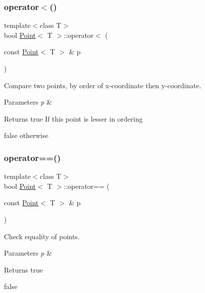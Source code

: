 \subsubsection{\texorpdfstring{operator$<$()}{operator<()}}
{\footnotesize\ttfamily template$<$class T$>$ \\
bool \mbox{\hyperlink{classPoint}{Point}}$<$ T $>$\+::operator$<$ (\begin{DoxyParamCaption}\item[{const \mbox{\hyperlink{classPoint}{Point}}$<$ T $>$ \&}]{p }\end{DoxyParamCaption})\hspace{0.3cm}{\ttfamily [inline]}}



Compare two points, by order of x-\/coordinate then y-\/coordinate. 


\begin{DoxyParams}{Parameters}
{\em p} & \\
\hline
\end{DoxyParams}
\begin{DoxyReturn}{Returns}
true If \textquotesingle{}this\textquotesingle{} point is lesser in ordering 

false otherwise 
\end{DoxyReturn}
\mbox{\label{classPoint_a5859891ca462697243a8cfa1e27cb91c}} 
\subsubsection{\texorpdfstring{operator==()}{operator==()}}
{\footnotesize\ttfamily template$<$class T$>$ \\
bool \mbox{\hyperlink{classPoint}{Point}}$<$ T $>$\+::operator== (\begin{DoxyParamCaption}\item[{const \mbox{\hyperlink{classPoint}{Point}}$<$ T $>$ \&}]{p }\end{DoxyParamCaption})\hspace{0.3cm}{\ttfamily [inline]}}



Check equality of points. 


\begin{DoxyParams}{Parameters}
{\em p} & \\
\hline
\end{DoxyParams}
\begin{DoxyReturn}{Returns}
true 

false 
\end{DoxyReturn}
\mbox{\label{classPoint_a33e4f445ed5dfc1a5f8cca8177c1a9c5}} 
